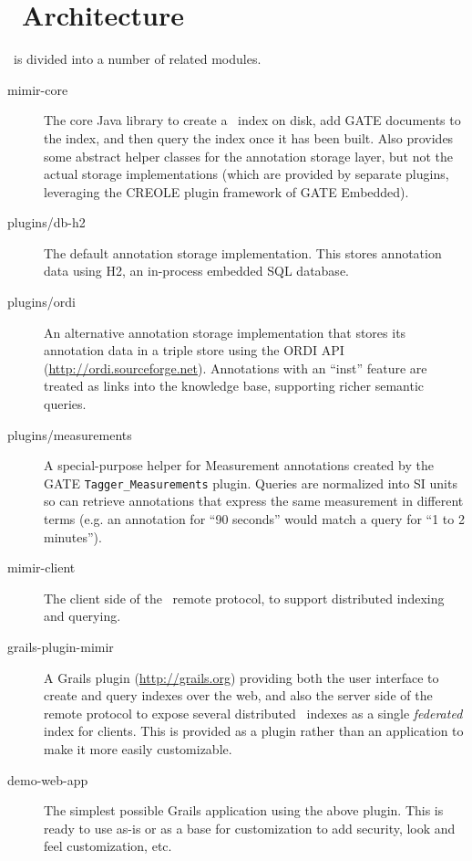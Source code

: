 \section{\Mimir\ Architecture}

\Mimir\ is divided into a number of related modules.

\begin{description}
\item[mimir-core] The core Java library to create a \Mimir\ index on disk, add
GATE documents to the index, and then query the index once it has been built.
Also provides some abstract helper classes for the annotation storage layer,
but not the actual storage implementations (which are provided by separate
plugins, leveraging the CREOLE plugin framework of GATE Embedded).

\item[plugins/db-h2] The default annotation storage implementation.  This
stores annotation data using H2, an in-process embedded SQL database.

\item[plugins/ordi] An alternative annotation storage implementation that
stores its annotation data in a triple store using the ORDI API
(\url{http://ordi.sourceforge.net}).  Annotations with an ``inst'' feature are
treated as links into the knowledge base, supporting richer semantic queries.

\item[plugins/measurements] A special-purpose helper for Measurement
annotations created by the GATE {\tt Tagger\_Measurements} plugin.  Queries are
normalized into SI units so can retrieve annotations that express the same
measurement in different terms (e.g. an annotation for ``90 seconds'' would
match a query for ``1 to 2 minutes'').

\item[mimir-client] The client side of the \Mimir\ remote protocol, to support
distributed indexing and querying.

\item[grails-plugin-mimir] A Grails plugin (\url{http://grails.org}) providing
both the user interface to create and query indexes over the web, and also the
server side of the remote protocol to expose several distributed \Mimir\
indexes as a single {\em federated} index for clients.  This is provided as a
plugin rather than an application to make it more easily customizable.

\item[demo-web-app] The simplest possible Grails application using the above
plugin.  This is ready to use as-is or as a base for customization to add
security, look and feel customization, etc.
\end{description}

